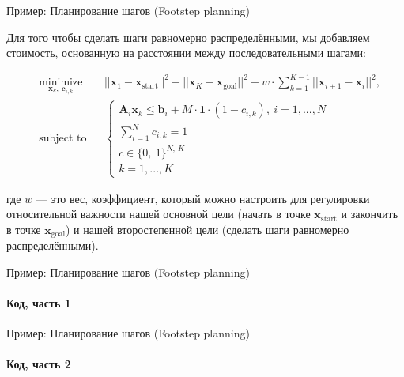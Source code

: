 \documentclass{beamer}
\begin{document}
	
	
	
	
	\begin{frame}{Пример: Планирование шагов (Footstep planning)}
		\begin{flushleft}
			
			Для того чтобы сделать шаги равномерно распределёнными, мы добавляем стоимость, основанную на расстоянии между последовательными шагами:
			
			\begin{equation*}
				\begin{aligned}
					& \underset{\mathbf{x}_k, \ \mathbf{c}_{i,k}}{\text{minimize}}
					& & ||\mathbf{x}_1 - \mathbf{x}_{\text{start}}||^2 + ||\mathbf{x}_K - \mathbf{x}_{\text{goal}}||^2 + w \cdot \sum_{k=1}^{K-1} ||\mathbf{x}_{i+1} - \mathbf{x}_i||^2, \\
					& \text{subject to}
					& & \begin{cases}
						\mathbf{A}_i \mathbf{x}_k \leq \mathbf{b}_i + M \cdot \mathbf{1} \cdot (1 - c_{i, k}), \ i = 1,...,N \\
						\sum_{i=1}^N c_{i, k} = 1 \\
						c  \in \{0, \ 1 \}^{N, \ K} \\
						k = 1,...,K
					\end{cases}
				\end{aligned}
			\end{equation*}
			
			где $w$ — это вес, коэффициент, который можно настроить для регулировки относительной важности нашей основной цели (начать в точке $\mathbf{x}_{\text{start}}$ и закончить в точке $\mathbf{x}_{\text{goal}}$) и нашей второстепенной цели (сделать шаги равномерно распределёнными).  
			
		\end{flushleft}
	\end{frame}
	
	
	\begin{frame}{Пример: Планирование шагов (Footstep planning)}
		\framesubtitle{Код, часть 1}
		\begin{flushleft}
			
			
			
		\end{flushleft}
	\end{frame}
	
	
	\begin{frame}{Пример: Планирование шагов (Footstep planning)}
		\framesubtitle{Код, часть 2}
		\begin{flushleft}
			
			
			
		\end{flushleft}
	\end{frame}
	
\end{document}
